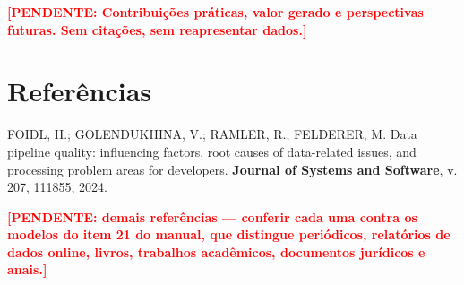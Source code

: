 \documentclass[11pt,a4paper]{article}
\newenvironment{referencias}
  {\begingroup\singlespacing\RaggedRight\setlength{\parindent}{0pt}}
  {\par\endgroup}
\newcommand{\refitem}[1]{#1\par\vspace{0.5\baselineskip}}
\newcommand{\pend}[1]{\textcolor{red}{\textbf{[PENDENTE: #1]}}}
\begin{document}
\pend{Contribuições práticas, valor gerado e perspectivas futuras. Sem
citações, sem reapresentar dados.}

\section{Referências}

\begin{referencias}
\refitem{FOIDL, H.; GOLENDUKHINA, V.; RAMLER, R.; FELDERER, M. Data
pipeline quality: influencing factors, root causes of data-related
issues, and processing problem areas for developers. \textbf{Journal of
Systems and Software}, v. 207, 111855, 2024.}

\refitem{\pend{demais referências --- conferir cada uma contra os modelos
do item 21 do manual, que distingue periódicos, relatórios de dados
online, livros, trabalhos acadêmicos, documentos jurídicos e anais.}}
\end{referencias}

\end{document}
